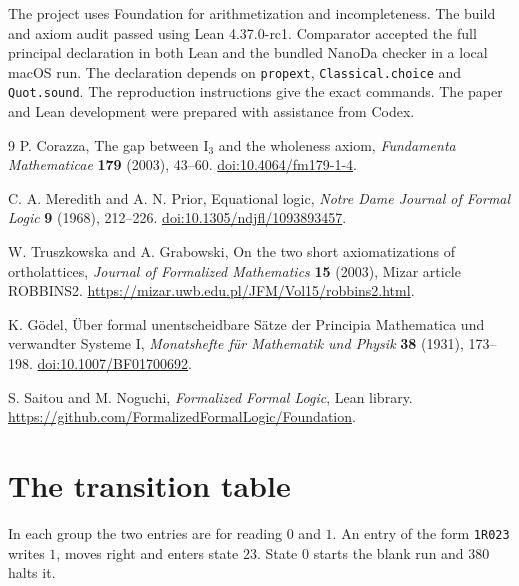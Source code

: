 \documentclass[11pt,letterpaper]{article}
\newcommand{\code}[1]{\texttt{\nolinkurl{#1}}}
\begin{document}
The project uses Foundation \cite{foundation} for arithmetization
and incompleteness. The build and axiom audit passed using Lean
4.37.0-rc1. Comparator accepted the full principal declaration in
both Lean and the bundled NanoDa checker in a local macOS run.
The declaration depends on \code{propext}, \code{Classical.choice}
and \code{Quot.sound}. The reproduction instructions give the
exact commands. The paper and Lean development were
prepared with assistance from Codex.

\begingroup
\small
\begin{thebibliography}{9}
\setlength{\itemsep}{0pt}
P. Corazza,
The gap between $\mathrm I_3$ and the wholeness axiom,
\emph{Fundamenta Mathematicae} \textbf{179} (2003), 43--60.
\href{https://doi.org/10.4064/fm179-1-4}{doi:10.4064/fm179-1-4}.

C. A. Meredith and A. N. Prior,
Equational logic,
\emph{Notre Dame Journal of Formal Logic} \textbf{9} (1968), 212--226.
\href{https://doi.org/10.1305/ndjfl/1093893457}{doi:10.1305/ndjfl/1093893457}.

W. Truszkowska and A. Grabowski,
On the two short axiomatizations of ortholattices,
\emph{Journal of Formalized Mathematics} \textbf{15} (2003),
Mizar article ROBBINS2.
\url{https://mizar.uwb.edu.pl/JFM/Vol15/robbins2.html}.

K. G\"odel,
\"Uber formal unentscheidbare S\"atze der Principia Mathematica
und verwandter Systeme I,
\emph{Monatshefte f\"ur Mathematik und Physik} \textbf{38} (1931),
173--198.
\href{https://doi.org/10.1007/BF01700692}{doi:10.1007/BF01700692}.

S. Saitou and M. Noguchi,
\emph{Formalized Formal Logic}, Lean library.
\url{https://github.com/FormalizedFormalLogic/Foundation}.
\end{thebibliography}
\endgroup

\clearpage
\appendix
\section{The transition table}\label{app:table}

In each group the two entries are for reading $0$ and $1$.
An entry of the form \texttt{1R023} writes $1$, moves right and
enters state $23$. State $0$ starts the blank run and $380$ halts it.
\end{document}
